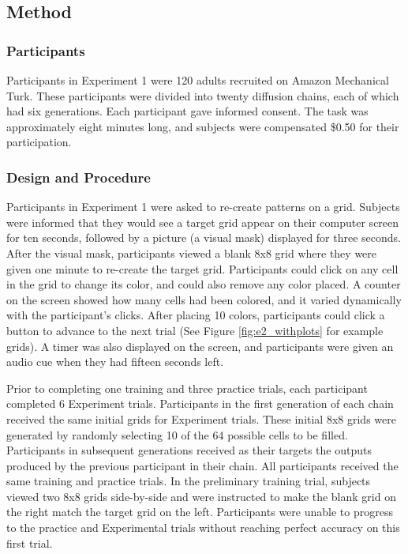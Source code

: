 \documentclass[10pt, letterpaper]{article}
\begin{document}
\subsection{Method}\label{method}

\subsubsection{Participants}\label{participants}

Participants in Experiment 1 were 120 adults recruited on Amazon
Mechanical Turk. These participants were divided into twenty diffusion
chains, each of which had six generations. Each participant gave
informed consent. The task was approximately eight minutes long, and
subjects were compensated \$0.50 for their participation.

\subsubsection{Design and Procedure}\label{design-and-procedure}

Participants in Experiment 1 were asked to re-create patterns on a grid.
Subjects were informed that they would see a target grid appear on their
computer screen for ten seconds, followed by a picture (a visual mask)
displayed for three seconds. After the visual mask, participants viewed
a blank 8x8 grid where they were given one minute to re-create the
target grid. Participants could click on any cell in the grid to change
its color, and could also remove any color placed. A counter on the
screen showed how many cells had been colored, and it varied dynamically
with the participant's clicks. After placing 10 colors, participants
could click a button to advance to the next trial (See Figure
\ref{fig:e2_withplots} for example grids). A timer was also displayed on
the screen, and participants were given an audio cue when they had
fifteen seconds left.

Prior to completing one training and three practice trials, each
participant completed 6 Experiment trials. Participants in the first
generation of each chain received the same initial grids for Experiment
trials. These initial 8x8 grids were generated by randomly selecting 10
of the 64 possible cells to be filled. Participants in subsequent
generations received as their targets the outputs produced by the
previous participant in their chain. All participants received the same
training and practice trials. In the preliminary training trial,
subjects viewed two 8x8 grids side-by-side and were instructed to make
the blank grid on the right match the target grid on the left.
Participants were unable to progress to the practice and Experimental
trials without reaching perfect accuracy on this first trial.
\end{document}

